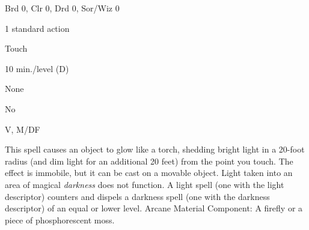 
\begin{description*}
\item[Level:] Brd 0, Clr 0, Drd 0, Sor/Wiz 0
\item[Casting Time:] 1 standard action
\item[Range:] Touch
\item[Duration:] 10 min./level (D)
\item[Saving Throw:] None
\item[Spell Resistance:] No
\item[Components:] V, M/DF
\end{description*}

This spell causes an object to glow like a torch, shedding bright light in a 20-foot
radius (and dim light for an additional 20 feet) from the point you touch. The
effect is immobile, but it can be cast on a movable object. Light taken into an
area of magical \textit{darkness} does not function.
A light spell (one with the light descriptor) counters and dispels a darkness spell
(one with the darkness descriptor) of an equal or lower level.
Arcane Material Component: A firefly or a piece of phosphorescent moss.